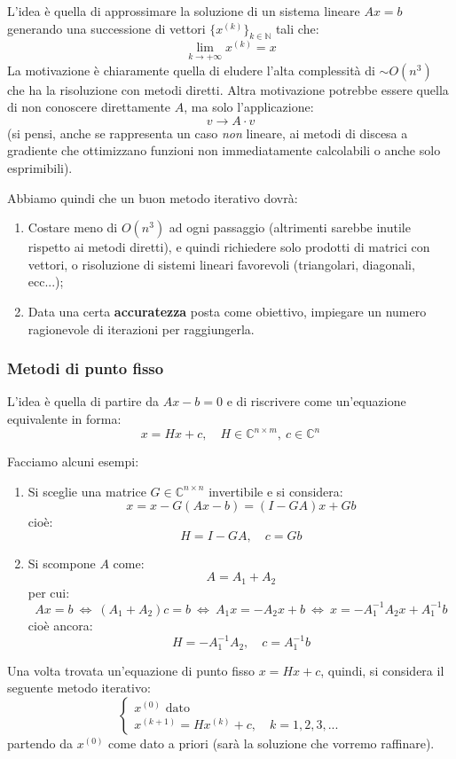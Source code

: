 \documentclass[a4paper,11pt]{article}
\begin{document}
L'idea è quella di approssimare la soluzione di un sistema lineare $Ax = b$ generando una successione di vettori $\{ x^{(k)} \}_{k \in \mathbb{N}}$ tali che:
$$
\lim_{k \rightarrow +\infty} x^{(k)} = x
$$
La motivazione è chiaramente quella di eludere l'alta complessità di $\sim O(n^3)$ che ha la risoluzione con metodi diretti.
Altra motivazione potrebbe essere quella di non conoscere direttamente $A$, ma solo l'applicazione:
$$
v \rightarrow A \cdot v
$$
(si pensi, anche se rappresenta un caso \textit{non} lineare, ai metodi di discesa a gradiente che ottimizzano funzioni non immediatamente calcolabili o anche solo esprimibili).

Abbiamo quindi che un buon metodo iterativo dovrà:
\begin{enumerate}
	\item Costare meno di $O(n^3)$ ad ogni passaggio (altrimenti sarebbe inutile rispetto ai metodi diretti), e quindi richiedere solo prodotti di matrici con vettori, o risoluzione di sistemi lineari favorevoli (triangolari, diagonali, ecc...);
	
	\item Data una certa \textbf{accuratezza} posta come obiettivo, impiegare un numero ragionevole di iterazioni per raggiungerla.
\end{enumerate}

\subsubsection{Metodi di punto fisso}
L'idea è quella di partire da $Ax - b = 0$ e di riscrivere come un'equazione equivalente in forma:
$$
x = Hx + c, \quad H \in \mathbb{C}^{n \times m}, \ c \in \mathbb{C}^n
$$

Facciamo alcuni esempi:
\begin{enumerate}
	\item Si sceglie una matrice $G \in \mathbb{C}^{n \times n}$ invertibile e si considera:
		$$
		x = x - G(Ax - b) = (I - GA) x + Gb
		$$
		cioè:
		$$
		H = I - GA, \quad c = Gb
		$$

	\item Si scompone $A$ come:
		$$
		A = A_1 + A_2
		$$
		per cui:
		$$
		Ax = b \ \Leftrightarrow \ (A_1 + A_2) c = b \ \Leftrightarrow \ A_1 x = - A_2 x + b \ \Leftrightarrow \ x = -A_1^{-1} A_2 x + A_1^{-1} b
		$$
		cioè ancora:
		$$
		H = -A_1^{-1}A_2 , \quad c = A_1^{-1} b
		$$
\end{enumerate}

Una volta trovata un'equazione di punto fisso $x = H x + c$, quindi, si considera il seguente metodo iterativo:
\[
	\begin{cases}
		x^{(0)} \text{ dato} \\
		x^{(k + 1)} = H x^{(k)} + c, \quad k = 1, 2, 3, ...
	\end{cases}
\]
partendo da $x^{(0)}$ come dato a priori (sarà la soluzione che vorremo raffinare).
\end{document}
